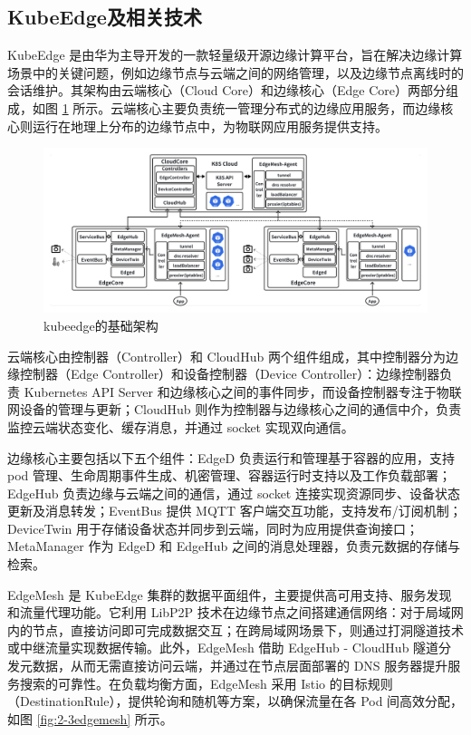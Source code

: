 \subsection{KubeEdge及相关技术}

KubeEdge 是由华为主导开发的一款轻量级开源边缘计算平台，旨在解决边缘计算场景中的关键问题，例如边缘节点与云端之间的网络管理，以及边缘节点离线时的会话维护。其架构由云端核心（Cloud Core）和边缘核心（Edge Core）两部分组成，如图 \ref{fig:2-3kubeedge} 所示。云端核心主要负责统一管理分布式的边缘应用服务，而边缘核心则运行在地理上分布的边缘节点中，为物联网应用服务提供支持。

\begin{figure}[ht]
  \centering
  \includegraphics[width=\linewidth]{pics/2-2kubeedge.png}
  \caption{kubeedge的基础架构}
  \label{fig:2-3kubeedge}
\end{figure}

云端核心由控制器（Controller）和 CloudHub 两个组件组成，其中控制器分为边缘控制器（Edge Controller）和设备控制器（Device Controller）：边缘控制器负责 Kubernetes API Server 和边缘核心之间的事件同步，而设备控制器专注于物联网设备的管理与更新；CloudHub 则作为控制器与边缘核心之间的通信中介，负责监控云端状态变化、缓存消息，并通过 socket 实现双向通信。

边缘核心主要包括以下五个组件：EdgeD 负责运行和管理基于容器的应用，支持 pod 管理、生命周期事件生成、机密管理、容器运行时支持以及工作负载部署；EdgeHub 负责边缘与云端之间的通信，通过 socket 连接实现资源同步、设备状态更新及消息转发；EventBus 提供 MQTT 客户端交互功能，支持发布/订阅机制；DeviceTwin 用于存储设备状态并同步到云端，同时为应用提供查询接口；MetaManager 作为 EdgeD 和 EdgeHub 之间的消息处理器，负责元数据的存储与检索。

EdgeMesh 是 KubeEdge 集群的数据平面组件，主要提供高可用支持、服务发现和流量代理功能。它利用 LibP2P 技术在边缘节点之间搭建通信网络：对于局域网内的节点，直接访问即可完成数据交互；在跨局域网场景下，则通过打洞隧道技术或中继流量实现数据传输。此外，EdgeMesh 借助 EdgeHub - CloudHub 隧道分发元数据，从而无需直接访问云端，并通过在节点层面部署的 DNS 服务器提升服务搜索的可靠性。在负载均衡方面，EdgeMesh 采用 Istio 的目标规则（DestinationRule），提供轮询和随机等方案，以确保流量在各 Pod 间高效分配，如图 \ref{fig:2-3edgemesh} 所示。

